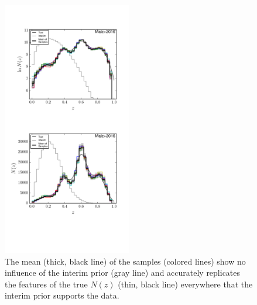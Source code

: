 \documentclass[preprint]{aastex}
\begin{document}
\begin{figure}
\includegraphics[width=0.5\textwidth]{figs/uint/samps.pdf}
\caption{The mean (thick, black line) of the samples (colored lines) show no 
influence of the interim prior (gray line) and accurately replicates the 
features of the true $N(z)$ (thin, black line) everywhere that the interim 
prior supports the data.}
\label{fig:intu-samp}
\end{figure}
\end{document}
